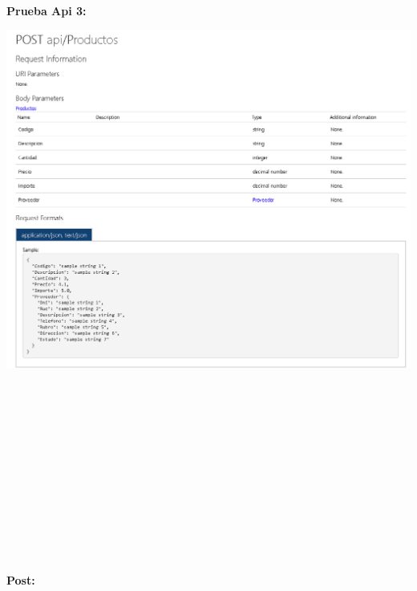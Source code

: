 \begin{flushleft}
\textbf{}\\
\textbf{}\\
\textbf{}\\
\textbf{}\\
\textbf{}\\
\textbf{}\\
\textbf{}\\
\textbf{}\\
\textbf{Prueba Api 3:}\\
\begin{center}
	\includegraphics[width=19cm]{./Imagenes/api3} 
	\end{center}
\textbf{}\\
\textbf{}\\
\textbf{}\\
\textbf{}\\
\textbf{}\\
\textbf{}\\
\textbf{}\\
\textbf{}\\
\textbf{}\\
\textbf{}\\
\textbf{}\\
\textbf{}\\
\textbf{Post:}\\
\begin{center}

\end{center}
\end{flushleft}

